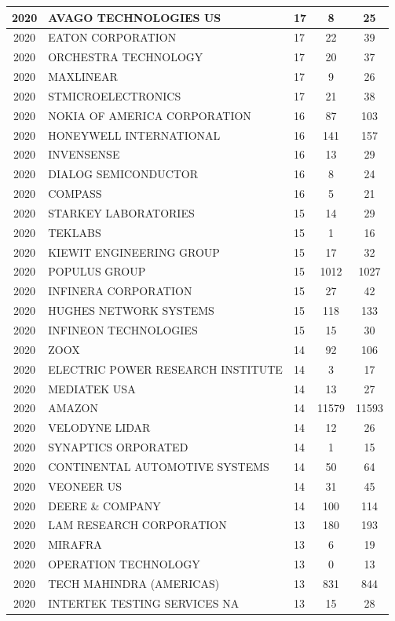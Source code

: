 \documentclass{article}%
\begin{document}
\begin{longtable}{c|p{20em}|p{5em}|c|c}
\hline%
2020&AVAGO TECHNOLOGIES US&17&8&25\\%
\hline%
2020&EATON CORPORATION&17&22&39\\%
\hline%
2020&ORCHESTRA TECHNOLOGY&17&20&37\\%
\hline%
2020&MAXLINEAR&17&9&26\\%
\hline%
2020&STMICROELECTRONICS&17&21&38\\%
\hline%
2020&NOKIA OF AMERICA CORPORATION&16&87&103\\%
\hline%
2020&HONEYWELL INTERNATIONAL&16&141&157\\%
\hline%
2020&INVENSENSE&16&13&29\\%
\hline%
2020&DIALOG SEMICONDUCTOR&16&8&24\\%
\hline%
2020&COMPASS&16&5&21\\%
\hline%
2020&STARKEY LABORATORIES&15&14&29\\%
\hline%
2020&TEKLABS&15&1&16\\%
\hline%
2020&KIEWIT ENGINEERING GROUP&15&17&32\\%
\hline%
2020&POPULUS GROUP&15&1012&1027\\%
\hline%
2020&INFINERA CORPORATION&15&27&42\\%
\hline%
2020&HUGHES NETWORK SYSTEMS&15&118&133\\%
\hline%
2020&INFINEON TECHNOLOGIES&15&15&30\\%
\hline%
2020&ZOOX&14&92&106\\%
\hline%
2020&ELECTRIC POWER RESEARCH INSTITUTE&14&3&17\\%
\hline%
2020&MEDIATEK USA&14&13&27\\%
\hline%
2020&AMAZON&14&11579&11593\\%
\hline%
2020&VELODYNE LIDAR&14&12&26\\%
\hline%
2020&SYNAPTICS ORPORATED&14&1&15\\%
\hline%
2020&CONTINENTAL AUTOMOTIVE SYSTEMS&14&50&64\\%
\hline%
2020&VEONEER US&14&31&45\\%
\hline%
2020&DEERE \& COMPANY&14&100&114\\%
\hline%
2020&LAM RESEARCH CORPORATION&13&180&193\\%
\hline%
2020&MIRAFRA&13&6&19\\%
\hline%
2020&OPERATION TECHNOLOGY&13&0&13\\%
\hline%
2020&TECH MAHINDRA (AMERICAS)&13&831&844\\%
\hline%
2020&INTERTEK TESTING SERVICES NA&13&15&28\\%

\end{longtable}
\end{document}
